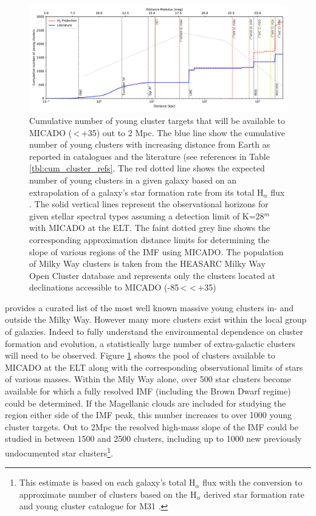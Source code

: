 \begin{figure}

    \centering
    \includegraphics[width=\textwidth]{images/young_clusters_within_2Mpc_incl_MW}

    \caption{Cumulative number of young cluster targets that will be available to MICADO (\textdelta\,\textless\,+35\textdegree) out to 2 Mpc. The blue line show the cumulative number of young clusters with increasing distance from Earth as reported in catalogues and the literature (see references in Table \ref{tbl:cum_cluster_refs}.
    The red dotted line shows the expected number of young clusters in a given galaxy based on an extrapolation of a galaxy's star formation rate from its total H$_\alpha$ flux \citep{caldwell09}.
    The solid vertical lines represent the observational horizons for given stellar spectral types assuming a detection limit of K=28$^m$ with MICADO at the ELT. The faint dotted grey line shows the corresponding approximation distance limits for determining the slope of various regions of the IMF using MICADO.
    The population of Milky Way clusters is taken from the HEASARC Milky Way Open Cluster database \citep{heasarc_mwsc} and represents only the clusters located at declinations accessible to MICADO (-85\textdegree\,\textless\,\textdelta\,\textless\,+35\textdegree)
    }
    \label{fig:local_group_cluster_number}

\end{figure}

\citet{portegies2010} provides a curated list of the most well known massive young clusters in- and outside the Milky Way. However many more clusters exist within the local group of galaxies. 
Indeed to fully understand the environmental dependence on cluster formation and evolution, a statistically large number of extra-galactic clusters will need to be observed. 
Figure \ref{fig:local_group_cluster_number} shows the pool of clusters available to MICADO at the ELT along with the corresponding observational limits of stars of various masses. 
Within the Mily Way alone, over 500 star clusters become available for which a fully resolved IMF (including the Brown Dwarf regime) could be determined. 
If the Magellanic clouds are included for studying the region either side of the IMF peak, this number increases to over 1000 young cluster targets. 
Out to 2Mpc the resolved high-mass slope of the IMF could be studied in between 1500 and 2500 clusters, including up to 1000 new previously undocumented star clusters\footnote{This estimate is based on each galaxy's total H$_\alpha$ flux with the conversion to approximate number of clusters based on the H$_\alpha$ derived star formation rate and young cluster catalogue for M31 \citep{caldwell09}.}.

